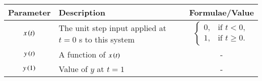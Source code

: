 \renewcommand{\arraystretch}{2}
\begin{tabular}{|c|p{4cm}|c|}
\hline 
\textbf{Parameter} & \textbf{Description} & \textbf{Formulae/Value} \\
\hline
$x\left(t\right)$ & The unit step input applied at $t = 0$ s to this system & $\begin{cases}
0, & \text{if } t < 0, \\
1, & \text{if } t \geq 0.
\end{cases}$ \\
\hline
$y \left(t\right)$ & A function of $x\left(t\right)$ & - \\
\hline
$y\left(1\right)$ & Value of $y$ at $t=1$ & -\\
\hline
\end{tabular}
